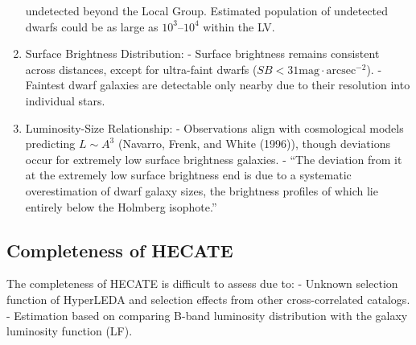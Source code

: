 \documentclass[
]{article}
\begin{document}
\begin{enumerate}
  undetected beyond the Local Group. Estimated population of undetected
  dwarfs could be as large as \(10^3–10^4\) within the LV.
\item
  Surface Brightness Distribution: - Surface brightness remains
  consistent across distances, except for ultra-faint dwarfs
  (\(SB <31 \text{mag}\cdot\text{arcsec}^{-2}\)). - Faintest dwarf
  galaxies are detectable only nearby due to their resolution into
  individual stars.
\item
  Luminosity-Size Relationship: - Observations align with cosmological
  models predicting \(L\sim A^3\) (Navarro, Frenk, and White (1996)),
  though deviations occur for extremely low surface brightness galaxies.
  - ``The deviation from it at the extremely low surface brightness end
  is due to a systematic overestimation of dwarf galaxy sizes, the
  brightness profiles of which lie entirely below the Holmberg
  isophote.''
\end{enumerate}

\subsection{Completeness of HECATE}\label{completeness-of-hecate}

The completeness of HECATE is difficult to assess due to: - Unknown
selection function of HyperLEDA and selection effects from other
cross-correlated catalogs. - Estimation based on comparing B-band
luminosity distribution with the galaxy luminosity function (LF).
\end{document}
